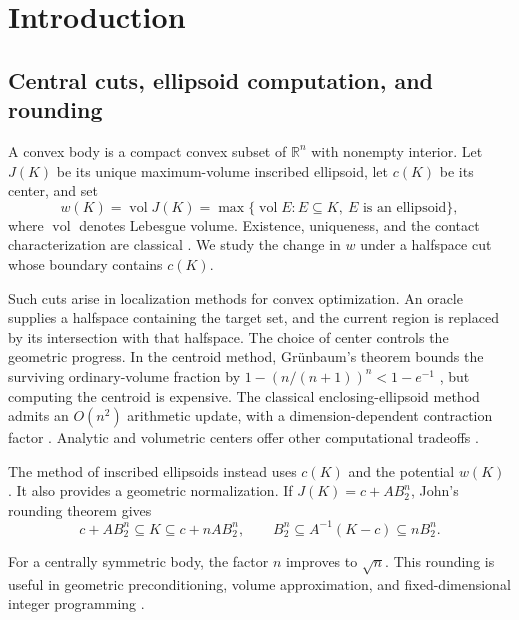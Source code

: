 \section{Introduction}\label{sec:1}

\subsection{Central cuts, ellipsoid computation, and rounding}\label{sec:1.1}

A convex body is a compact convex subset of $\mathbb R^n$ with nonempty interior. Let $J(K)$ be its unique maximum-volume inscribed ellipsoid, let $c(K)$ be its center, and set
\begin{equation}\label{eq:1.1}
w(K)=\operatorname{vol}J(K)
=\max\{\operatorname{vol}E:E\subseteq K,\ E\text{ is an ellipsoid}\},
\end{equation}
where $\operatorname{vol}$ denotes Lebesgue volume. Existence, uniqueness, and the contact characterization are classical \cite{John1948,GG2007}. We study the change in $w$ under a halfspace cut whose boundary contains $c(K)$.

Such cuts arise in localization methods for convex optimization. An oracle supplies a halfspace containing the target set, and the current region is replaced by its intersection with that halfspace. The choice of center controls the geometric progress. In the centroid method, Grünbaum's theorem bounds the surviving ordinary-volume fraction by $1-(n/(n+1))^n<1-e^{-1}$ \cite{Grunbaum1960}, but computing the centroid is expensive. The classical enclosing-ellipsoid method admits an $O(n^2)$ arithmetic update, with a dimension-dependent contraction factor \cite{GLS1988,Todd2023}. Analytic and volumetric centers offer other computational tradeoffs \cite{BV2004,AV1995,Vaidya1996,Anstreicher1997}.

The method of inscribed ellipsoids instead uses $c(K)$ and the potential $w(K)$ \cite{TKE1988}. It also provides a geometric normalization. If $J(K)=c+AB_2^n$, John's rounding theorem gives
\begin{equation}\label{eq:1.2}
c+AB_2^n\subseteq K\subseteq c+nAB_2^n,
\qquad
B_2^n\subseteq A^{-1}(K-c)\subseteq nB_2^n.
\end{equation}

For a centrally symmetric body, the factor $n$ improves to $\sqrt n$. This rounding is useful in geometric preconditioning, volume approximation, and fixed-dimensional integer programming \cite{GG2007,KT1993}.

